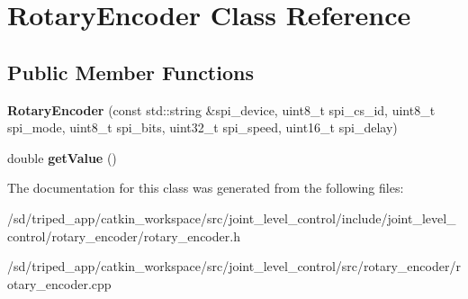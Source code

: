 \hypertarget{classRotaryEncoder}{}\section{Rotary\+Encoder Class Reference}
\label{classRotaryEncoder}
\subsection*{Public Member Functions}
\begin{DoxyCompactItemize}
\item 
\mbox{\label{classRotaryEncoder_ac57e2531f91e03b48bcc2b7e3f0edf62}} 
{\bfseries Rotary\+Encoder} (const std\+::string \&spi\+\_\+device, uint8\+\_\+t spi\+\_\+cs\+\_\+id, uint8\+\_\+t spi\+\_\+mode, uint8\+\_\+t spi\+\_\+bits, uint32\+\_\+t spi\+\_\+speed, uint16\+\_\+t spi\+\_\+delay)
\item 
\mbox{\label{classRotaryEncoder_adf89df36f38d0ee87b454f22c25a85f0}} 
double {\bfseries get\+Value} ()
\end{DoxyCompactItemize}


The documentation for this class was generated from the following files\+:\begin{DoxyCompactItemize}
\item 
/sd/triped\+\_\+app/catkin\+\_\+workspace/src/joint\+\_\+level\+\_\+control/include/joint\+\_\+level\+\_\+control/rotary\+\_\+encoder/rotary\+\_\+encoder.\+h\item 
/sd/triped\+\_\+app/catkin\+\_\+workspace/src/joint\+\_\+level\+\_\+control/src/rotary\+\_\+encoder/rotary\+\_\+encoder.\+cpp\end{DoxyCompactItemize}
